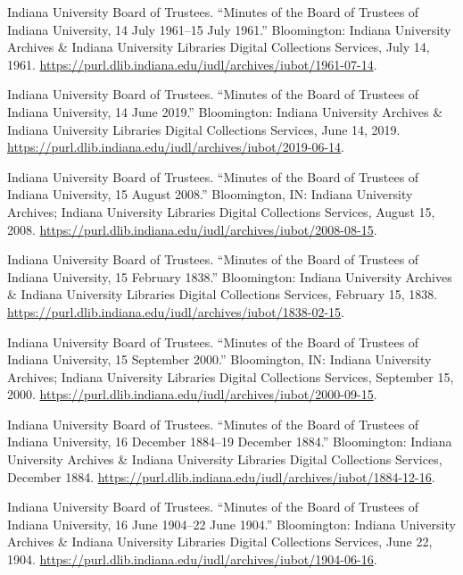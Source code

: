 \documentclass[
  american,
  letterpaper,
]{scrreprt}
\newlength{\cslhangindent}
\newenvironment{CSLReferences}[2] %
 {\begin{list}{}{%
  \setlength{\itemindent}{0pt}
  \setlength{\leftmargin}{0pt}
  \setlength{\parsep}{0pt}
  \ifodd #1
   \setlength{\leftmargin}{\cslhangindent}
   \setlength{\itemindent}{-1\cslhangindent}
  \fi
  \setlength{\itemsep}{#2\baselineskip}}}
 {\end{list}}
\begin{document}
\begin{CSLReferences}{1}{0}
Indiana University Board of Trustees. {``Minutes of the Board of
Trustees of Indiana University, 14 July 1961--15 July 1961.''}
Bloomington: Indiana University Archives \& Indiana University Libraries
Digital Collections Services, July 14, 1961.
\url{https://purl.dlib.indiana.edu/iudl/archives/iubot/1961-07-14}.

Indiana University Board of Trustees. {``Minutes of the Board of
Trustees of Indiana University, 14 June 2019.''} Bloomington: Indiana
University Archives \& Indiana University Libraries Digital Collections
Services, June 14, 2019.
\url{https://purl.dlib.indiana.edu/iudl/archives/iubot/2019-06-14}.

Indiana University Board of Trustees. {``Minutes of the Board of
Trustees of Indiana University, 15 August 2008.''} Bloomington, IN:
Indiana University Archives; Indiana University Libraries Digital
Collections Services, August 15, 2008.
\url{https://purl.dlib.indiana.edu/iudl/archives/iubot/2008-08-15}.

Indiana University Board of Trustees. {``Minutes of the Board of
Trustees of Indiana University, 15 February 1838.''} Bloomington:
Indiana University Archives \& Indiana University Libraries Digital
Collections Services, February 15, 1838.
\url{https://purl.dlib.indiana.edu/iudl/archives/iubot/1838-02-15}.

Indiana University Board of Trustees. {``Minutes of the Board of
Trustees of Indiana University, 15 September 2000.''} Bloomington, IN:
Indiana University Archives; Indiana University Libraries Digital
Collections Services, September 15, 2000.
\url{https://purl.dlib.indiana.edu/iudl/archives/iubot/2000-09-15}.

Indiana University Board of Trustees. {``Minutes of the Board of
Trustees of Indiana University, 16 December 1884--19 December 1884.''}
Bloomington: Indiana University Archives \& Indiana University Libraries
Digital Collections Services, December 1884.
\url{https://purl.dlib.indiana.edu/iudl/archives/iubot/1884-12-16}.

Indiana University Board of Trustees. {``Minutes of the Board of
Trustees of Indiana University, 16 June 1904--22 June 1904.''}
Bloomington: Indiana University Archives \& Indiana University Libraries
Digital Collections Services, June 22, 1904.
\url{https://purl.dlib.indiana.edu/iudl/archives/iubot/1904-06-16}.


\end{CSLReferences}
\end{document}
